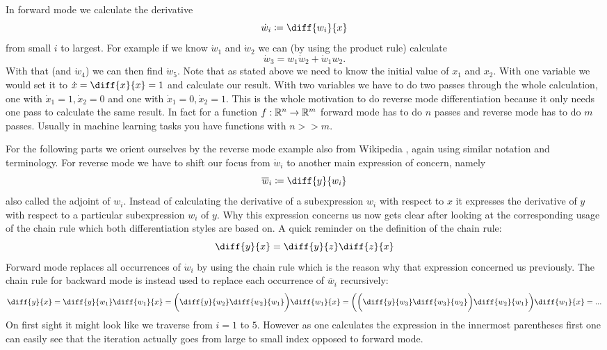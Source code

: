 In forward mode we calculate the derivative
\[ \dot w_i \coloneqq \diff{w_i}{x} \]
from small $i$ to largest. For example if we know $\dot w_1$ and $\dot w_2$ we can (by using the product rule) calculate
\[ \dot w_3 = w_1 \dot w_2 + \dot w_1 w_2. \]
With that (and $\dot w_4$) we can then find $\dot w_5$. Note that as stated above we need to know the initial value of $x_1$ and $x_2$. With one variable we would set it to $\dot x = \diff{x}{x} = 1$ and calculate our result. With two variables we have to do two passes through the whole calculation, one with $\dot x_1 = 1, \dot x_2 = 0$ and one with $\dot x_1 = 0, \dot x_2 = 1$. This is the whole motivation to do reverse mode differentiation because it only needs one pass to calculate the same result. In fact for a function $f: \mathbb{R}^n \to \mathbb{R}^m$ forward mode has to do $n$ passes and reverse mode has to do $m$ passes. Usually in machine learning tasks you have functions with $n >\! \!> m$.

\newcommand{\overw}[1]{\overline{w}_{#1}}
\newcommand{\diffyw}[1]{\diff{y}{w_{#1}}}
For the following parts we orient ourselves by the reverse mode example also from Wikipedia \cite{reverseAccumulationWiki}, again using similar notation and terminology. For reverse mode we have to shift our focus from $\dot w_i$ to another main expression of concern, namely
\[ \overw{i} \coloneqq \diffyw{i} \]
also called the adjoint of $w_i$. Instead of calculating the derivative of a subexpression $w_i$ with respect to $x$ it expresses the derivative of $y$ with respect to a particular subexpression $w_i$ of $y$. Why this expression concerns us now gets clear after looking at the corresponding usage of the chain rule which both differentiation styles are based on. A quick reminder on the definition of the chain rule:
\[ \diff{y}{x} = \diff{y}{z}\diff{z}{x} \]
Forward mode replaces all occurrences of $\dot w_i$ by using the chain rule which is the reason why that expression concerned us previously. The chain rule for backward mode is instead used to replace each occurrence of $\overw{i}$ recursively:
\newcommand{\diffw}[2]{\diff{w_{#1}}{w_{#2}}}
\[ \diff{y}{x} = \diffyw{1}\diff{w_1}{x} = \bigg(\diffyw{2}\diffw{2}{1}\bigg)\diff{w_1}{x} = \bigg(\bigg(\diffyw{3}\diffw{3}{2}\bigg)\diffw{2}{1}\bigg)\diff{w_1}{x} = ... \]
On first sight it might look like we traverse from $i = 1$ to $5$. However as one calculates the expression in the innermost parentheses first one can easily see that the iteration actually goes from large to small index opposed to forward mode.

